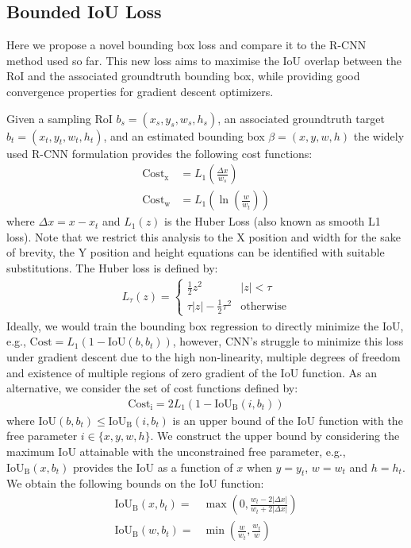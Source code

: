 \documentclass[10pt,twocolumn,letterpaper]{article}
\begin{document}
\subsection{Bounded IoU Loss} 
Here we propose a novel bounding box loss and compare it to the R-CNN method used so far. This new loss aims to maximise the IoU overlap between the RoI and the associated groundtruth bounding box, while providing good convergence properties for gradient descent optimizers. 

Given a sampling RoI $b_s=(x_s,y_s,w_s,h_s)$, an associated groundtruth target $b_t=(x_t,y_t,w_t,h_t)$, and an estimated bounding box $\beta=(x,y,w,h)$ the widely used R-CNN formulation\cite{fast-rcnn} provides the following cost functions:
\begin{align}
\mathrm{Cost_x} &= L_1 \left (\frac{\Delta x }{w_s } \right ) \\
\mathrm{Cost_w} &= L_1 \left (\ln \left (\frac{w}{w_t} \right ) \right )
\end{align}
where $\Delta x = x-x_t$ and $L_1(z)$ is the Huber Loss\cite{huber-loss} (also known as smooth L1 loss\cite{fast-rcnn}).  Note that we restrict this analysis to the X position and width for the sake of brevity, the Y position and height equations can be identified with suitable substitutions. The Huber loss is defined by:
\begin{gather}
L_{\tau}(z) = \left \lbrace \begin{matrix} \frac{1}{2} z^2 & |z| < \tau\\
\tau |z|-\frac{1}{2} \tau^2 & \mathrm{otherwise}
\end{matrix} \right.
\end{gather}
Ideally, we would train the bounding box regression to directly minimize the IoU, e.g., $\mathrm{Cost}=L_1(1-\mathrm{IoU}(b,b_t))$, however, CNN's struggle to minimize this loss under gradient descent due to the high non-linearity, multiple degrees of freedom and existence of multiple regions of zero gradient of the IoU function. As an alternative, we consider the set of cost functions defined by:
\begin{gather}
\mathrm{Cost_i} = 2 L_1( 1-\mathrm{IoU_{B}}(i, b_t)) 
\label{eq:local_cost}
\end{gather}
where $\mathrm{IoU}(b,b_t) \leq \mathrm{IoU_{B}}(i, b_t)$ is an upper bound of the IoU function with the free parameter $i \in \{ x,y,w,h \}$. We construct the upper bound by considering the maximum IoU attainable with the unconstrained free parameter, e.g., $\mathrm{IoU_{B}}(x, b_t)$ provides the IoU as a function of $x$ when $y=y_t$, $w=w_t$ and $h=h_t$. We obtain the following bounds on the IoU function:
\begin{align}
\mathrm{IoU_{B}}(x, b_t) =& \max \left ( 0, \frac{w_t - 2 |\Delta x|} {w_t + 2 |\Delta x|} \right )
\label{eq:local_x}
\\
\mathrm{IoU_{B}}(w, b_t) =& \min \left (\frac{w} {w_t}, \frac{w_t}{w} \right) 
\label{eq:local_w}
\end{align}
\end{document}
